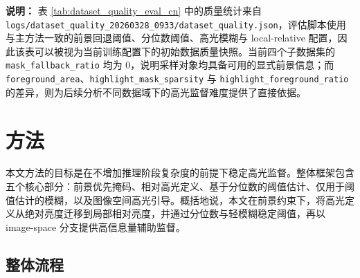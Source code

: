 \documentclass[UTF8,a4paper]{ctexart}
\begin{document}
\begin{table}[htbp]
\centering
\small
\setlength{\tabcolsep}{3.4pt}
\caption{基于预处理质量脚本的子数据集初始评估。计数列按“真实数量 $\times$ 计划数量 / 实际数量”的规则缩放；比例类质量指标直接保留脚本实测均值。}
\label{tab:dataset_quality_eval_cn}
\end{table}

\noindent\textbf{说明：} 表 \ref{tab:dataset_quality_eval_cn} 中的质量统计来自 \texttt{logs/dataset\_quality\_20260328\_0933/dataset\_quality.json}，评估脚本使用与主方法一致的前景回退阈值、分位数阈值、高光模糊与 local-relative 配置，因此该表可以被视为当前训练配置下的初始数据质量快照。当前四个子数据集的 \texttt{mask\_fallback\_ratio} 均为 0，说明采样对象均具备可用的显式前景信息；而 \texttt{foreground\_area}、\texttt{highlight\_mask\_sparsity} 与 \texttt{highlight\_foreground\_ratio} 的差异，则为后续分析不同数据域下的高光监督难度提供了直接依据。

\section{方法}

本文方法的目标是在不增加推理阶段复杂度的前提下稳定高光监督。整体框架包含五个核心部分：前景优先掩码、相对高光定义、基于分位数的阈值估计、仅用于阈值估计的模糊，以及图像空间高光引导。概括地说，本文在前景约束下，将高光定义从绝对亮度迁移到局部相对亮度，并通过分位数与轻模糊稳定阈值，再以 image-space 分支提供高信息量辅助监督。

\subsection{整体流程}
\end{document}
